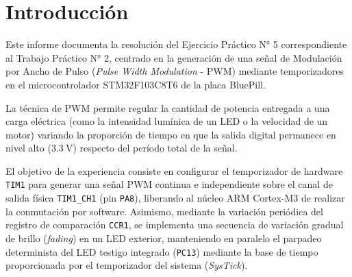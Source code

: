 \chapter{Introducción}
\label{ch.ej5:introduccion}

Este informe documenta la resolución del Ejercicio Práctico N° 5 correspondiente al Trabajo Práctico N° 2,
centrado en la generación de una señal de Modulación por Ancho de Pulso (\textit{Pulse Width Modulation} - PWM)
mediante temporizadores en el microcontrolador STM32F103C8T6 de la placa BluePill.

La técnica de PWM permite regular la cantidad de potencia entregada a una carga eléctrica (como la intensidad
lumínica de un LED o la velocidad de un motor) variando la proporción de tiempo en que la salida digital permanece
en nivel alto ($\qty{3.3}{\V}$) respecto del período total de la señal.

El objetivo de la experiencia consiste en configurar el temporizador de hardware \texttt{TIM1} para generar una
señal PWM continua e independiente sobre el canal de salida física \texttt{TIM1\_CH1} (pin \texttt{PA8}), liberando
al núcleo ARM Cortex-M3 de realizar la conmutación por software. Asimismo, mediante la variación periódica del
registro de comparación \texttt{CCR1}, se implementa una secuencia de variación gradual de brillo (\textit{fading})
en un LED exterior, manteniendo en paralelo el parpadeo determinista del LED testigo integrado (\texttt{PC13})
mediante la base de tiempo proporcionada por el temporizador del sistema (\textit{SysTick}).
